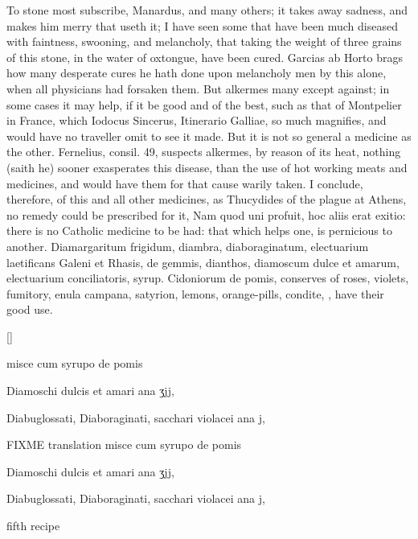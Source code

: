 To  stone most subscribe, Manardus, and many others; it
takes away sadness, and makes him merry that useth it; I have seen some
that have been much diseased with faintness, swooning, and melancholy,
that taking the weight of three grains of this stone, in the water of
oxtongue, have been cured. Garcias ab Horto brags how many desperate
cures he hath done upon melancholy men by this alone, when all
physicians had forsaken them. But alkermes many except against; in some
cases it may help, if it be good and of the best, such as that of
Montpelier in France, which Iodocus Sincerus, Itinerario Galliae,
so much magnifies, and would have no traveller omit to see it made. But
it is not so general a medicine as the other. Fernelius, consil. 49,
suspects alkermes, by reason of its heat, nothing (saith he)
sooner exasperates this disease, than the use of hot working meats and
medicines, and would have them for that cause warily taken. I conclude,
therefore, of this and all other medicines, as Thucydides of the plague
at Athens, no remedy could be prescribed for it, Nam quod uni profuit,
hoc aliis erat exitio: there is no Catholic medicine to be had: that
which helps one, is pernicious to another.
Diamargaritum frigidum, diambra, diaboraginatum, electuarium
laetificans Galeni et Rhasis, de gemmis, dianthos, diamoscum dulce et
amarum, electuarium conciliatoris, syrup. Cidoniorum de pomis,
conserves of roses, violets, fumitory, enula campana, satyrion, lemons,
orange-pills, condite, \etc{}, have their good use.

\begin{Prescription}[H]
[\baselineskip]
\begin{prescriptionbox}{}{\textlatin{misce cum syrupo de pomis}}
\item \textlatin{Diamoschi dulcis et amari ana ʒjj},
\item \textlatin{Diabuglossati, Diaboraginati, sacchari violacei ana j},
\end{prescriptionbox}
\begin{prescriptionbox}{FIXME translation }{\textlatin{misce cum syrupo de pomis}}
\item \textlatin{Diamoschi dulcis et amari ana ʒjj},
\item \textlatin{Diabuglossati, Diaboraginati, sacchari violacei ana j},
\end{prescriptionbox}
\caption{fifth recipe}
\end{Prescription}

